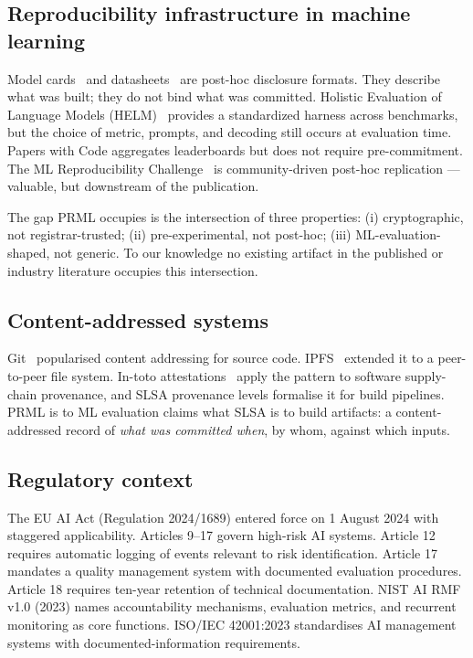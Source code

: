 \documentclass[11pt, a4paper]{article}
\begin{document}
\subsection{Reproducibility infrastructure in machine learning}

Model cards~\cite{mitchell2019modelcards} and datasheets~\cite{gebru2018datasheets} are post-hoc disclosure formats. They describe what was built; they do not bind what was committed. Holistic Evaluation of Language Models (HELM)~\cite{liang2023helm} provides a standardized harness across benchmarks, but the choice of metric, prompts, and decoding still occurs at evaluation time. Papers with Code aggregates leaderboards but does not require pre-commitment. The ML Reproducibility Challenge~\cite{pineau2021reproducibility} is community-driven post-hoc replication --- valuable, but downstream of the publication.

The gap PRML occupies is the intersection of three properties: (i) cryptographic, not registrar-trusted; (ii) pre-experimental, not post-hoc; (iii) ML-evaluation-shaped, not generic. To our knowledge no existing artifact in the published or industry literature occupies this intersection.

\subsection{Content-addressed systems}

Git~\cite{git2005} popularised content addressing for source code. IPFS~\cite{benet2014ipfs} extended it to a peer-to-peer file system. In-toto attestations~\cite{torresarias2019intoto} apply the pattern to software supply-chain provenance, and SLSA provenance levels formalise it for build pipelines. PRML is to ML evaluation claims what SLSA is to build artifacts: a content-addressed record of \emph{what was committed when}, by whom, against which inputs.

\subsection{Regulatory context}

The EU AI Act (Regulation 2024/1689) entered force on 1 August 2024 with staggered applicability. Articles 9--17 govern high-risk AI systems. Article 12 requires automatic logging of events relevant to risk identification. Article 17 mandates a quality management system with documented evaluation procedures. Article 18 requires ten-year retention of technical documentation. NIST AI RMF v1.0 (2023) names accountability mechanisms, evaluation metrics, and recurrent monitoring as core functions. ISO/IEC 42001:2023 standardises AI management systems with documented-information requirements.
\end{document}
